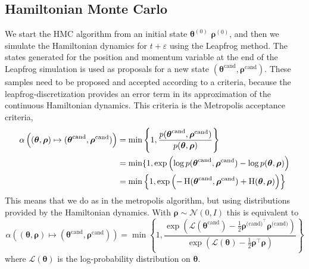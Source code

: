 \subsection{Hamiltonian Monte Carlo}
We start the HMC algorithm from an initial state $\boldsymbol{\theta}^{(0)}$ $\boldsymbol{\rho}^{(0)}$, and then we simulate the Hamiltonian dynamics for $t+\varepsilon$ using the Leapfrog method. The states generated for the position and momentum variable at the end of the Leapfrog simulation is used as proposals for a new state $(\boldsymbol{\theta}^{\text{cand}},\boldsymbol{\rho}^{\text{cand}})$. These samples need to be proposed and accepted according to a criteria, because the leapfrog-discretization provides an error term in its approximation of the continuous Hamiltonian dynamics. This criteria is the Metropolis acceptance criteria,
\begin{equation}\label{eq:hmc_acceptance}
\begin{split}
    \alpha\left((\boldsymbol{\theta},\boldsymbol{\rho}) \mapsto (\boldsymbol{\theta}^{\text{cand}} , \boldsymbol{\rho}^{\text{cand}} )\right) &= \min\left\{1, \frac{p(\boldsymbol{\theta}^{\text{cand}},\boldsymbol{\rho}^{\text{cand}})}{p(\boldsymbol{\theta},\boldsymbol{\rho})} \right\}\\
    &= \min\{1,\exp\left(\log p(\boldsymbol{\theta}^{\text{cand}},\boldsymbol{\rho}^{\text{cand}})- \log p(\boldsymbol{\theta}, \boldsymbol{\rho})  \right)\\
    &= \min \left\{1,\exp\left(-\operatorname{H}(\boldsymbol{\theta}^{\text{cand}},\boldsymbol{\rho}^{\text{cand}}) +\operatorname{H}(\boldsymbol{\theta},\boldsymbol{\rho})\right) \right\}
\end{split}
\end{equation}
This means that we do as in the metropolis algorithm, but using distributions provided by the Hamiltonian dynamics. With $\boldsymbol{\rho}\sim \mathcal{N}\left(0,\mathit{I}\right)$ this is equivalent to
\begin{equation*}
\alpha\left((\boldsymbol{\theta},\boldsymbol{\rho}) \mapsto (\boldsymbol{\theta}^{\text{cand}} , \boldsymbol{\rho}^{\text{cand}} )\right) 
=\min\left\{1,\frac{\exp\left(\mathcal{L}(\boldsymbol{\theta}^{\text{cand}})-\frac{1}{2}\boldsymbol{\rho}^{\text{(cand)}^\top}\boldsymbol{\rho}^{\text{(cand)}}\right)}{\exp\left(\mathcal{L}(\boldsymbol{\theta})-\frac{1}{2}\boldsymbol{\rho}^\top\boldsymbol{\rho}\right)}\right\}
\end{equation*}
where $\mathcal{L}\left(\boldsymbol{\theta}\right)$ is the log-probability distribution on $\boldsymbol{\theta}$.
